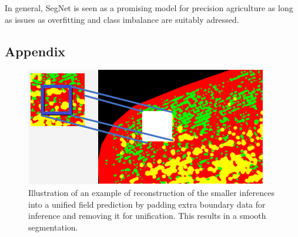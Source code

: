 \documentclass{article}
\begin{document}
In general, SegNet is seen as a promising model for precision agriculture  as long as issues as overfitting and class imbalance are suitably adressed. 




\subsection{Appendix}
\begin{figure}[h!]
	\centering
	\includegraphics[width=0.7\linewidth]{"reconstruction DL"}
	\caption{Illustration of an example of reconstruction of the smaller inferences into a unified field prediction by padding extra boundary data for inference and removing it for unification. This results in a smooth segmentation.}
	\label{reconstruction_technique}
\end{figure}
\end{document}
